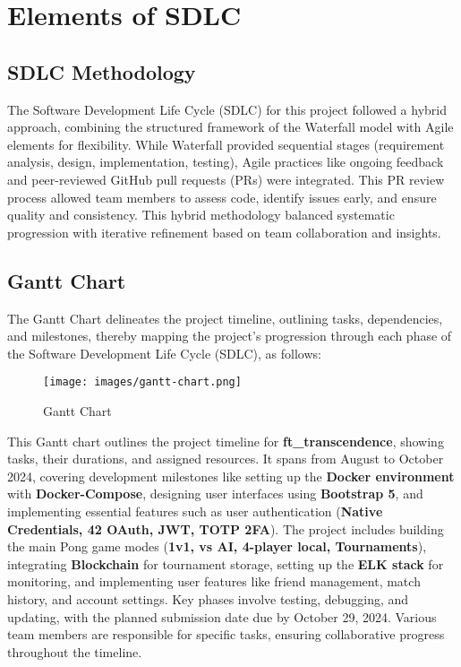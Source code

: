 \chapter{Elements of SDLC}

\section{SDLC Methodology}

The Software Development Life Cycle (SDLC) for this project followed a hybrid approach, combining the structured framework of the Waterfall model with Agile elements for flexibility. While Waterfall provided sequential stages (requirement analysis, design, implementation, testing), Agile practices like ongoing feedback and peer-reviewed GitHub pull requests (PRs) were integrated. This PR review process allowed team members to assess code, identify issues early, and ensure quality and consistency. This hybrid methodology balanced systematic progression with iterative refinement based on team collaboration and insights.

\section{Gantt Chart}
The Gantt Chart delineates the project timeline, outlining tasks, dependencies, and milestones, thereby mapping the project’s progression through each phase of the Software Development Life Cycle (SDLC), as follows:

\begin{figure}[H]
    \texttt{[image: images/gantt-chart.png]}
    \caption{Gantt Chart}
    \label{fig:gantt-chart}
\end{figure}

This Gantt chart outlines the project timeline for \textbf{ft\_transcendence}, showing tasks, their durations, and assigned resources. It spans from August to October 2024, covering development milestones like setting up the \textbf{Docker environment} with \textbf{Docker-Compose}, designing user interfaces using \textbf{Bootstrap 5}, and implementing essential features such as user authentication (\textbf{Native Credentials, 42 OAuth, JWT, TOTP 2FA}). The project includes building the main Pong game modes (\textbf{1v1, vs AI, 4-player local, Tournaments}), integrating \textbf{Blockchain} for tournament storage, setting up the \textbf{ELK stack} for monitoring, and implementing user features like friend management, match history, and account settings. Key phases involve testing, debugging, and updating, with the planned submission date due by October 29, 2024. Various team members are responsible for specific tasks, ensuring collaborative progress throughout the timeline.

